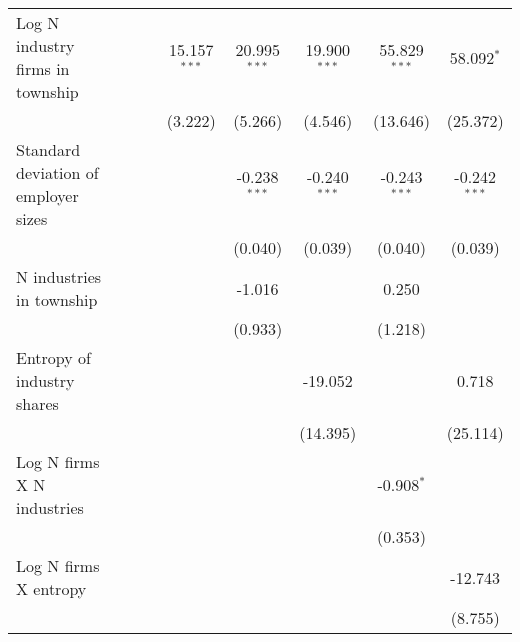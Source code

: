 \begin{tabular}{lcccccccc}
   Log N industry firms in township                      &             &                 &                 & 15.157$^{***}$  & 20.995$^{***}$  & 19.900$^{***}$  & 55.829$^{***}$  & 58.092$^{*}$\\   
                                                         &             &                 &                 & (3.222)         & (5.266)         & (4.546)         & (13.646)        & (25.372)\\   
   Standard deviation of employer sizes                  &             &                 &                 &                 & -0.238$^{***}$  & -0.240$^{***}$  & -0.243$^{***}$  & -0.242$^{***}$\\   
                                                         &             &                 &                 &                 & (0.040)         & (0.039)         & (0.040)         & (0.039)\\   
   N industries in township                              &             &                 &                 &                 & -1.016          &                 & 0.250           &   \\   
                                                         &             &                 &                 &                 & (0.933)         &                 & (1.218)         &   \\   
   Entropy of industry shares                            &             &                 &                 &                 &                 & -19.052         &                 & 0.718\\   
                                                         &             &                 &                 &                 &                 & (14.395)        &                 & (25.114)\\   
   Log N firms X N industries                            &             &                 &                 &                 &                 &                 & -0.908$^{*}$    &   \\   
                                                         &             &                 &                 &                 &                 &                 & (0.353)         &   \\   
   Log N firms X entropy                                 &             &                 &                 &                 &                 &                 &                 & -12.743\\   
                                                         &             &                 &                 &                 &                 &                 &                 & (8.755)\\   

\end{tabular}
